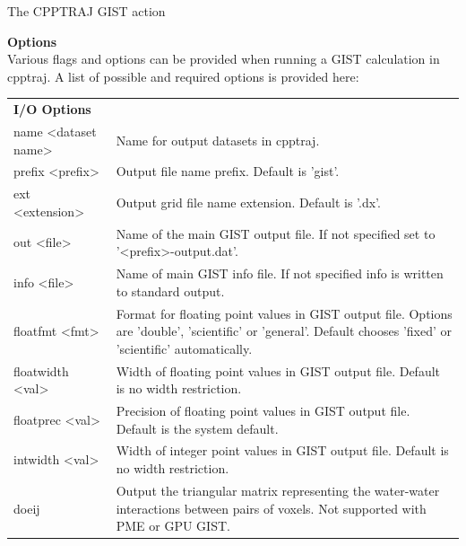 \documentclass[9pt,tutorial]{livecoms}
\newcommand{\software}{\texttt}
\begin{document}
%
\FloatBarrier
\begin{Checklists*}[h!]
\begin{checklist}{The CPPTRAJ GIST action}\label{cheatsheet}

\textbf{Options}\\
Various flags and options can be provided when running a GIST calculation in cpptraj. 
A list of possible and required options is provided here:
\medskip

\begin{tabularx}{\textwidth}{@{}l X @{} }
\toprule
\textbf{I/O Options} &\\
name <dataset name> & Name for output datasets in cpptraj. \\
prefix <prefix> & Output file name prefix. Default is 'gist'.\\
ext <extension> & Output grid file name extension. Default is  '.dx'. \\
out <file> & Name of the main GIST output file. If not specified set to '<prefix>-output.dat'.\\
info <file> & Name of main GIST info file. If not specified info is written to standard output. \\
floatfmt <fmt> & Format for floating point values in GIST output file. Options are 'double', 'scientific' or 'general'. Default chooses 'fixed' or 'scientific' automatically. \\
floatwidth <val>& Width of floating point values in GIST output file. Default is no width restriction. \\
floatprec <val>& Precision of floating point values in GIST output file. Default is the system default. \\
intwidth <val>& Width of integer point values in GIST output file. Default is no width restriction. \\
doeij & Output the triangular matrix representing the water-water 
interactions between pairs of voxels. Not supported with PME or GPU GIST.\\


\end{tabularx}
\end{checklist}
\end{Checklists*}
\end{document}
